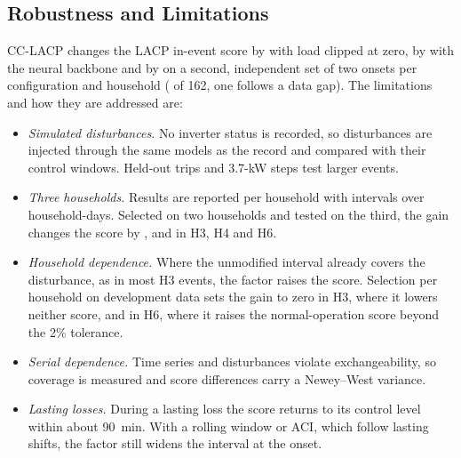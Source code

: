\documentclass[conference,a4paper]{IEEEtran}
\begin{document}
\subsection{Robustness and Limitations}
CC-LACP changes the LACP in-event score by \robclipCCLACPvsLACP{} \robclipCCLACPvsLACPCI{} with load clipped at
zero, by \robmlpCCLACPvsLACP{} \robmlpCCLACPvsLACPCI{} with the neural backbone and by \robfrzCCLACPvsLACP{}
\robfrzCCLACPvsLACPCI{} on a second, independent set of two onsets per configuration and household (\nFrozen{} of 162, one follows a
data gap). The limitations and how they are
addressed are:
\begin{itemize}
\item \emph{Simulated disturbances.} No inverter status is recorded, so disturbances are injected through the
same models as the record and compared with their control windows. Held-out trips and 3.7-kW steps test larger
events.
\item \emph{Three households.} Results are reported per household with intervals over household-days. Selected on
two households and tested on the third, the gain changes the score by \lohorelHThree, \lohorelHFour{} and
\lohorelHSix{} in H3, H4 and H6.
\item \emph{Household dependence.} Where the unmodified interval already covers the disturbance, as in most H3
events, the factor raises the score. Selection per household on development data sets the gain to zero in H3,
where it lowers neither score, and in H6, where it raises the normal-operation score beyond the 2\% tolerance.
\item \emph{Serial dependence.} Time series and disturbances violate exchangeability, so coverage is measured and
score differences carry a Newey--West variance.
\item \emph{Lasting losses.} During a lasting loss the score returns to its control level within about 90~min. With
a rolling window or ACI, which follow lasting shifts, the factor still widens the interval at the onset.
\end{itemize}
\end{document}

